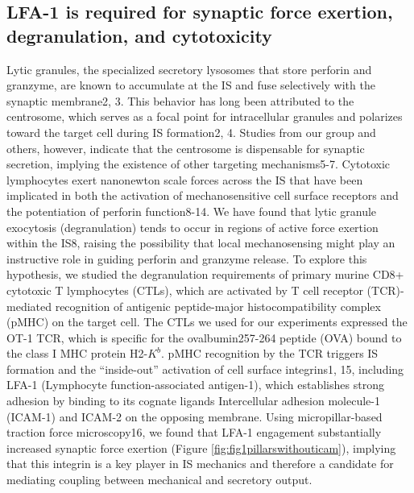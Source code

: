 \subsection{LFA-1 is required for synaptic force exertion, degranulation, and cytotoxicity}
Lytic granules, the specialized secretory lysosomes that store perforin and granzyme, are known to accumulate at the IS and fuse selectively with the synaptic membrane2, 3. This behavior has long been attributed to the centrosome, which serves as a focal point for intracellular granules and polarizes toward the target cell during IS formation2, 4. Studies from our group and others, however, indicate that the centrosome is dispensable for synaptic secretion, implying the existence of other targeting mechanisms5-7. Cytotoxic lymphocytes exert nanonewton scale forces across the IS that have been implicated in both the activation of mechanosensitive cell surface receptors and the potentiation of perforin function8-14. We have found that lytic granule exocytosis (degranulation) tends to occur in regions of active force exertion within the IS8, raising the possibility that local mechanosensing might play an instructive role in guiding perforin and granzyme release. To explore this hypothesis, we studied the degranulation requirements of primary murine CD8+ cytotoxic T lymphocytes (CTLs), which are activated by T cell receptor (TCR)-mediated recognition of antigenic peptide-major histocompatibility complex (pMHC) on the target cell. The CTLs we used for our experiments expressed the OT-1 TCR, which is specific for the ovalbumin257-264 peptide (OVA) bound to the class I MHC protein H2-$K^{b}$. pMHC recognition by the TCR triggers IS formation and the “inside-out” activation of cell surface integrins1, 15, including LFA-1 (Lymphocyte function-associated antigen-1), which establishes strong adhesion by binding to its cognate ligands Intercellular adhesion molecule-1 (ICAM-1) and ICAM-2 on the opposing membrane. Using micropillar-based traction force microscopy16, we found that LFA-1 engagement substantially increased synaptic force exertion (Figure \ref{fig:fig1pillarswithouticam}), implying that this integrin is a key player in IS mechanics and therefore a candidate for mediating coupling between mechanical and secretory output. 

